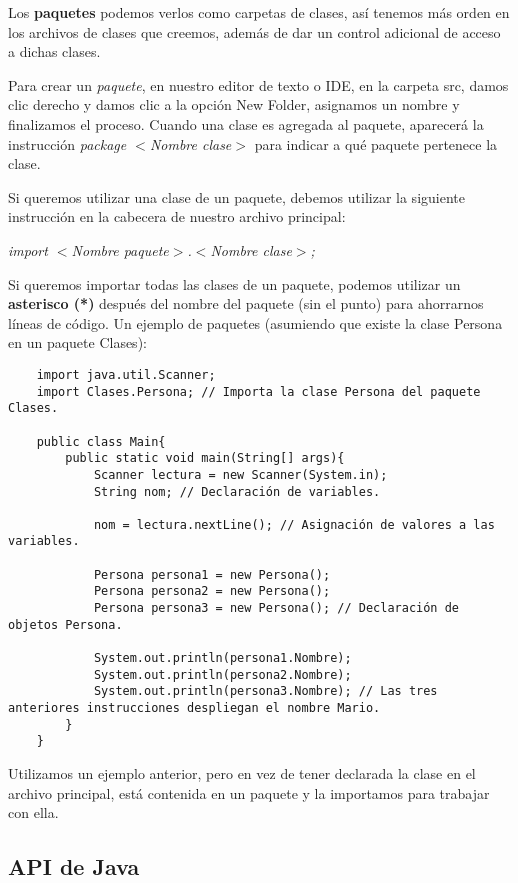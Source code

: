 Los \textbf{paquetes} podemos verlos como carpetas de clases, así tenemos más orden en los archivos de clases que creemos, además de dar un control adicional de acceso a dichas clases.

Para crear un \textit{paquete}, en nuestro editor de texto o IDE, en la carpeta src, damos clic derecho y damos clic a la opción New Folder, asignamos un nombre y finalizamos el proceso. Cuando una clase es agregada al paquete, aparecerá la instrucción \textit{package $<$Nombre clase$>$} para indicar a qué paquete pertenece la clase.

Si queremos utilizar una clase de un paquete, debemos utilizar la siguiente instrucción en la cabecera de nuestro archivo principal:
\begin{center}
    \textit{import $<$Nombre paquete$>$.$<$Nombre clase$>$;}
\end{center}

Si queremos importar todas las clases de un paquete, podemos utilizar un \textbf{asterisco (*)} después del nombre del paquete (sin el punto) para ahorrarnos líneas de código. Un ejemplo de paquetes (asumiendo que existe la clase Persona en un paquete Clases):
\begin{lstlisting}
    import java.util.Scanner;
    import Clases.Persona; // Importa la clase Persona del paquete Clases.
    
    public class Main{
        public static void main(String[] args){
            Scanner lectura = new Scanner(System.in);
            String nom; // Declaración de variables.
            
            nom = lectura.nextLine(); // Asignación de valores a las variables.
            
            Persona persona1 = new Persona();
            Persona persona2 = new Persona();
            Persona persona3 = new Persona(); // Declaración de objetos Persona.
            
            System.out.println(persona1.Nombre);
            System.out.println(persona2.Nombre);
            System.out.println(persona3.Nombre); // Las tres anteriores instrucciones despliegan el nombre Mario.
        }
    }
\end{lstlisting}

Utilizamos un ejemplo anterior, pero en vez de tener declarada la clase en el archivo principal, está contenida en un paquete y la importamos para trabajar con ella.


\subsection{API de Java}

